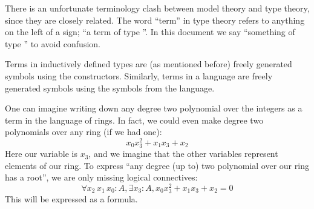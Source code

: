 \begin{rmk}
  There is an unfortunate terminology clash between model theory and type theory,
  since they are closely related.
  The word ``term'' in type theory refers to anything on the left of a \code{:} sign;
  ``a term of type ''.
  In this document we say ``something of type '' to avoid confusion.

  Terms in inductively defined types are (as mentioned before)
  freely generated symbols using the constructors.
  Similarly, terms in a language are freely generated symbols using
  the symbols from the language.
\end{rmk}

One can imagine writing down any degree two polynomial over the integers
as a term in the language of rings.
In fact, we could even make degree two polynomials over any ring (if we had one):
\[ x_{0} x_{3}^{2} + x_{1} x_{3} + x_{2} \]
Here our variable is $x_{3}$, and we imagine that the other variables represent
elements of our ring.
To express ``any degree (up to) two polynomial over our ring has a root'',
we are only missing logical connectives:
\[ \forall x_{2} \, x_{1} \, x_{0} : A, \exists x_{3} : A, x_{0} x_{3}^{2} + x_{1} x_{3} + x_{2} = 0 \]
This will be expressed as a formula.

